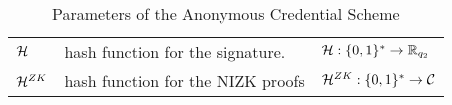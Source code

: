 \begin{table*}
\begin{center}
{\begin{tabular}{lll}
		\midrule
		$\mathcal{H}$                                                  & hash function for the
		signature.                                                  & $\mathcal{H} : \{0,1\}^*
		\rightarrow \mathbb{R}_{q_2}$        \\
		$\mathcal{H}^{ZK}$                                                    & hash function for the
		NIZK proofs                                                 & $\mathcal{H}^{ZK} : \{0,1\}^*
		\rightarrow \mathcal{C}$          \\
	\end{tabular}
}
\end{center}
		\caption{\label{tab:parameters_ac_scheme}Parameters of the Anonymous Credential Scheme}
\end{table*}

